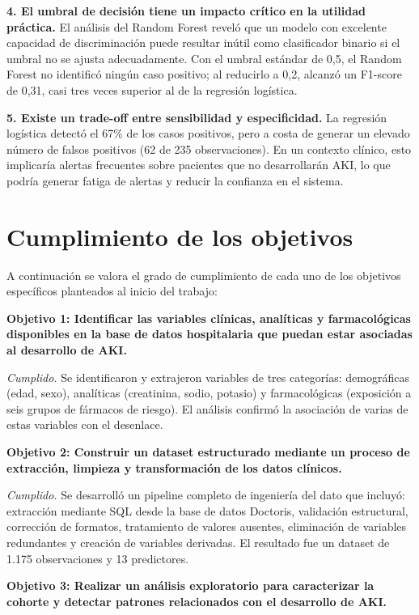 \documentclass[12pt, a4paper, oneside]{report}
\begin{document}
\textbf{4. El umbral de decisión tiene un impacto crítico en la utilidad práctica.} El análisis del Random Forest reveló que un modelo con excelente capacidad de discriminación puede resultar inútil como clasificador binario si el umbral no se ajusta adecuadamente. Con el umbral estándar de 0,5, el Random Forest no identificó ningún caso positivo; al reducirlo a 0,2, alcanzó un F1-score de 0,31, casi tres veces superior al de la regresión logística.

\textbf{5. Existe un trade-off entre sensibilidad y especificidad.} La regresión logística detectó el 67\% de los casos positivos, pero a costa de generar un elevado número de falsos positivos (62 de 235 observaciones). En un contexto clínico, esto implicaría alertas frecuentes sobre pacientes que no desarrollarán AKI, lo que podría generar fatiga de alertas y reducir la confianza en el sistema.

\section{Cumplimiento de los objetivos}

A continuación se valora el grado de cumplimiento de cada uno de los objetivos específicos planteados al inicio del trabajo:

\textbf{Objetivo 1: Identificar las variables clínicas, analíticas y farmacológicas disponibles en la base de datos hospitalaria que puedan estar asociadas al desarrollo de AKI.}

\textit{Cumplido.} Se identificaron y extrajeron variables de tres categorías: demográficas (edad, sexo), analíticas (creatinina, sodio, potasio) y farmacológicas (exposición a seis grupos de fármacos de riesgo). El análisis confirmó la asociación de varias de estas variables con el desenlace.

\textbf{Objetivo 2: Construir un dataset estructurado mediante un proceso de extracción, limpieza y transformación de los datos clínicos.}

\textit{Cumplido.} Se desarrolló un pipeline completo de ingeniería del dato que incluyó: extracción mediante SQL desde la base de datos Doctoris, validación estructural, corrección de formatos, tratamiento de valores ausentes, eliminación de variables redundantes y creación de variables derivadas. El resultado fue un dataset de 1.175 observaciones y 13 predictores.

\textbf{Objetivo 3: Realizar un análisis exploratorio para caracterizar la cohorte y detectar patrones relacionados con el desarrollo de AKI.}
\end{document}
